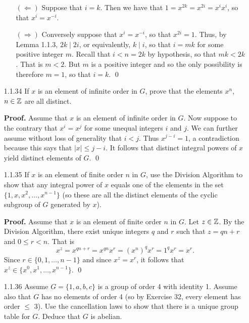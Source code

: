 \begin{enumerate}
\begin{enumerate}
               $(\Leftarrow)$ Suppose that $i = k$. Then we have that
               $1 = x^{2k} = x^{2i} = x^ix^i$, so that $x^i = x^{-i}$.

               $(\Rightarrow)$ Conversely suppose that $x^i = x^{-i}$, so that
               $x^{2i} =1$. Thus, by Lemma 1.1.3, $2k \mid 2i$, or equivalently,
               $k \mid i$, so that $i = mk$ for some positive integer $m$. 
               Recall that $i < n = 2k$ by hypothesis, so that $mk < 2k$. That 
               is $m < 2$. But $m$ is a positive integer and so the only
               possibility is therefore $m = 1$, so that $i = k$. \qed
      \end{enumerate}
   \item[1.1.34]  If $x$ is an element of infinite order in $G$, prove that the
                  elements $x^n$, $n \in \mathbb{Z}$ are all distinct.

      \textbf{Proof.} Assume that $x$ is an element of infinite order in $G$.
      Now suppose to the contrary that $x^i = x^j$ for some unequal integers
      $i$ and $j$. We can further assume without loss of generality that
      $i < j$. Thus $x^{j-i} = 1$, a contradiction because this says that
      $|x| \le j - i$. It follows that distinct integral powers of $x$ yield 
      distinct elements of $G$. \qed
   \item[1.1.35]  If $x$ is an element of finite order $n$ in $G$, use the 
                  Division Algorithm to show that any integral power of $x$ 
                  equals one of the elements in the set
                  $\{1, x, x^2, \ldots, x^{n-1}\}$ (so these are all the
                  distinct elements of the cyclic subgroup of $G$ generated by
                  $x$).

      \textbf{Proof.} Assume that $x$ is an element of finite order $n$ in $G$.
      Let $z \in \mathbb{Z}$. By the Division Algorithm, there exist unique integers
      $q$ and $r$ such that $z = qn + r$ and $0 \le r < n$. That is
      $$x^z = x^{qn+r} = x^{qn}x^r = (x^n)^qx^r = 1^qx^r = x^r.$$
      Since $r \in \{0, 1, \ldots, n - 1\}$ and since $x^z = x^r$, it follows
      that $x^z \in \{x^0, x^1, \ldots, x^{n-1}\}$. \qed
   \item[1.1.36]  Assume $G = \{1, a, b, c\}$ is a group of order 4 with
                  identity 1. Assume also that $G$ has no elements of order 4
                  (so by Exercise 32, every element has order $\le$ 3). Use the
                  cancellation laws to show that there is a unique group table
                  for $G$. Deduce that $G$ is abelian.


\end{enumerate}
